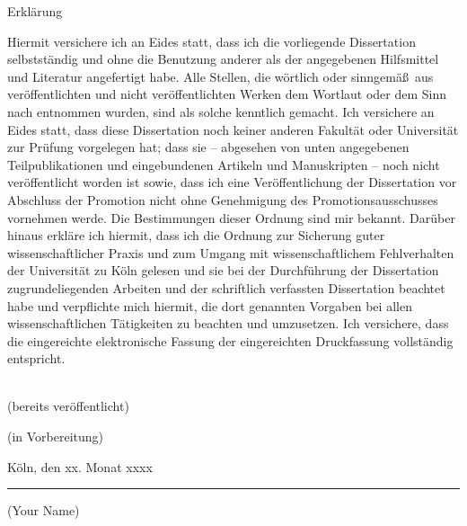 \cleardoublepage
\thispagestyle{empty}

\begin{center}
{\color{maincolor2} \mainregular \Huge Erkl\"arung} 
\end{center}
\vspace{1cm}

\noindent Hiermit versichere ich an Eides statt, dass ich die vorliegende Dissertation selbstst\"andig und ohne die Benutzung anderer als der angegebenen Hilfsmittel und Literatur angefertigt habe. Alle Stellen, die w\"ortlich oder sinngem\"a\ss~aus ver\"offentlichten und nicht ver\"offentlichten Werken dem Wortlaut oder dem Sinn nach entnommen wurden, sind als solche kenntlich gemacht. Ich versichere an Eides statt, dass diese Dissertation noch keiner anderen Fakult\"at oder Universit\"at zur Pr\"ufung vorgelegen hat; dass sie -- abgesehen von unten angegebenen Teilpublikationen und eingebundenen Artikeln und Manuskripten -- noch nicht ver\"offentlicht worden ist sowie, dass ich eine Ver\"offentlichung der Dissertation vor Abschluss der Promotion nicht ohne Genehmigung des Promotionsausschusses vornehmen werde. Die Bestimmungen dieser Ordnung sind mir bekannt. Dar\"uber hinaus erkl\"are ich hiermit, dass ich die Ordnung zur Sicherung guter wissenschaftlicher Praxis und zum Umgang mit wissenschaftlichem Fehlverhalten der Universit\"at zu K\"oln gelesen und sie bei der Durchf\"uhrung der Dissertation zugrundeliegenden Arbeiten und der schriftlich verfassten Dissertation beachtet habe und verpflichte mich hiermit, die dort genannten Vorgaben bei allen wissenschaftlichen T\"atigkeiten zu beachten und umzusetzen. Ich versichere, dass die eingereichte elektronische Fassung der eingereichten Druckfassung vollst\"andig entspricht.
\vspace{0.5cm}

\begin{center}
 \\
(bereits ver\"offentlicht)
\end{center}

\newrefcontext[labelprefix=P]
\printbibliography[category=own,heading=none]

\begin{center}
(in Vorbereitung)
\end{center}

\newrefcontext[labelprefix=U]
\printbibliography[category=prep,heading=none]

\vspace{1.5cm}

\noindent K\"oln, den xx. Monat xxxx \hfill
\begin{minipage}[t]{4.5cm}\begin{center}
	\rule[-1pt]{4cm}{.4pt}\vskip -5pt
	{\scriptsize (Your Name)}
\end{center}
\end{minipage}
